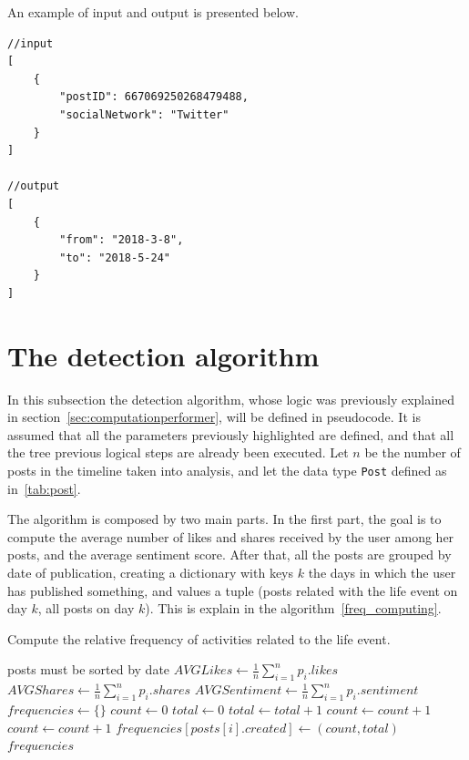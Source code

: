 An example of input and output is presented below.

\begin{Verbatim}
//input
[
	{
		"postID": 667069250268479488,
		"socialNetwork": "Twitter"
	}
]

//output
[
	{
		"from": "2018-3-8",
		"to": "2018-5-24"
	}
]
\end{Verbatim}

\section{The detection algorithm}
\label{sec:alg}

In this subsection the detection algorithm, whose logic was previously explained in section~\ref{sec:computationperformer}, will be defined in pseudocode. It is assumed that all the parameters previously highlighted are defined, and that all the tree previous logical steps are already been executed. Let $n$ be the number of posts in the timeline taken into analysis, and let the data type \texttt{Post} defined as in~\ref{tab:post}.

The algorithm is composed by two main parts. In the first part, the goal is to compute the average number of likes and shares received by the user among her posts, and the average sentiment score. After that, all the posts are grouped by date of publication, creating a dictionary with keys $k$ the days in which the user has published something, and values a tuple (posts related with the life event on day $k$, all posts on day $k$). This is explain in the algorithm~\ref{freq_computing}.

\begin{algorithm}
\caption{Compute the relative frequency of activities related to the life event.}
\label{freq_computing}
\begin{algorithmic}[1]
\Require posts must be sorted by date
\State $AVGLikes \gets \frac{1}{n} \sum_{i=1}^n p_i.likes $
\State $AVGShares \gets \frac{1}{n} \sum_{i=1}^n p_i.shares $
\State $AVGSentiment \gets \frac{1}{n} \sum_{i=1}^n p_i.sentiment$
\State $frequencies \gets \{\}$
\State $count \gets 0$
\State $total \gets 0$
	\State $total \gets total + 1$
		\State $count \gets count + 1$
		\State $count \gets count + 1$
	\EndIf
		\State $frequencies[posts[i].created] \gets (count, total)$
	\EndIf
\EndFor
\Return $frequencies$
\EndFunction 
\end{algorithmic}
\end{algorithm}


